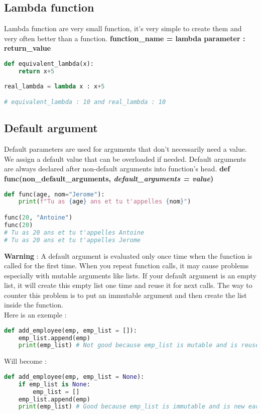 \documentclass[a4paper, 12pt, titlepage]{scrartcl} %
\begin{document}
\subsection{Lambda function}
\label{subsec:Lambda}
Lambda function are very small function, it's very simple to create them and very often better than a function. \textbf{function\_name = lambda parameter : return\_value}
\begin{lstlisting}[language=Python]
def equivalent_lambda(x):
	return x+5
	
real_lambda = lambda x : x+5

# equivalent_lambda : 10 and real_lambda : 10
\end{lstlisting} \vspace{5mm}

\subsection{Default argument}
Default parameters are used for arguments that don't necessarily need a value. We assign a default value that can be overloaded if needed. Default arguments are always declared after non-default arguments into function's head. \textbf{def func(non\_default\_arguments, \textit{default\_arguments = value})}

\begin{lstlisting}[language=Python]
def func(age, nom="Jerome"):
	print(f"Tu as {age} ans et tu t'appelles {nom}")

func(20, "Antoine")
func(20)
# Tu as 20 ans et tu t'appelles Antoine
# Tu as 20 ans et tu t'appelles Jerome
\end{lstlisting} \vspace{5mm}

\textbf{Warning} : A default argument is evaluated only once time when the function is called for the first time. When you repeat function calls, it may cause problems especially with mutable arguments like lists. If your default argument is an empty list, it will create this empty list one time and reuse it for next calls. The way to counter this problem is to put an immutable argument and then create the list inside the function. \\
Here is an exemple : 
\begin{lstlisting}[language=Python]
def add_employee(emp, emp_list = []):
    emp_list.append(emp)
    print(emp_list) # Not good because emp_list is mutable and is reused each time this function is called.
\end{lstlisting} \vspace{5mm}
Will become :
\begin{lstlisting}[language=Python]
def add_employee(emp, emp_list = None):
    if emp_list is None:
        emp_list = []
    emp_list.append(emp)
    print(emp_list) # Good because emp_list is immutable and is new each time this function is called.
\end{lstlisting} \vspace{5mm}
\end{document}

